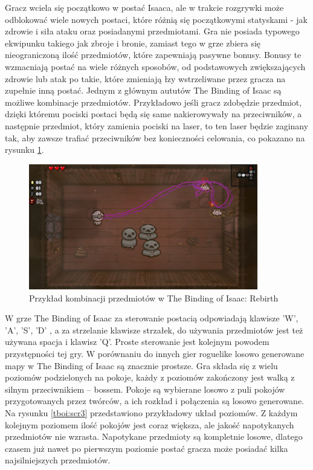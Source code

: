 \documentclass[12pt,twoside]{article}
\begin{document}
Gracz wciela się początkowo w postać Isaaca, ale w trakcie rozgrywki może odblokować wiele nowych postaci, które różnią się początkowymi statyskami - jak zdrowie i siła ataku oraz posiadanymi przedmiotami. Gra nie posiada typowego ekwipunku takiego jak zbroje i bronie, zamiast tego w grze zbiera się nieograniczoną ilość przedmiotów, które zapewniają pasywne bonusy. Bonusy te wzmacniają postać na wiele różnych sposobów, od podstawowych zwiększających zdrowie lub atak po takie, które zmieniają łzy wstrzeliwane przez gracza na zupełnie inną postać. Jednym z głównym aututów The Binding of Isaac są możliwe kombinacje przedmiotów. Przykładowo jeśli gracz zdobędzie przedmiot, dzięki któremu pociski postaci będą się same nakierowywały na przeciwników, a następnie przedmiot, który zamienia pociski na laser, to ten laser będzie zaginany tak, aby zawsze trafiać przeciwników bez konieczności celowania, co pokazano na rysunku \ref{tboi:scr2}.


\FloatBarrier
\begin{figure}[h]
	\centering
	\includegraphics[width=10cm]{images/tboi/scr2.png}
	\caption{Przykład kombinacji przedmiotów w The Binding of Isaac: Rebirth}
	\label{tboi:scr2}
\end{figure}
\FloatBarrier

W grze The Binding of Isaac za sterowanie postacią odpowiadają klawisze 'W', 'A', 'S', 'D' , a za strzelanie klawisze strzałek, do używania przedmiotów jest też używana spacja i klawisz 'Q'. Proste sterowanie jest kolejnym powodem przystępności tej gry.
 W porównaniu do innych gier roguelike losowo generowane mapy w The Binding of Isaac są znacznie prostsze. Gra składa się z wielu poziomów podzielonych na pokoje, każdy z poziomów zakończony jest walką z silnym przeciwnikiem -- bossem. Pokoje są wybierane losowo z puli pokojów przygotowanych przez twórców, a ich rozkład i połączenia są losowo generowane. Na rysunku \ref{tboi:scr3} przedstawiono przykładowy układ poziomów. Z każdym kolejnym poziomem ilość pokojów jest coraz większa, ale jakość napotykanych przedmiotów nie wzrasta. Napotykane przedmioty są kompletnie losowe, dlatego czasem już nawet po pierwszym poziomie postać gracza może posiadać kilka najsilniejszych przedmiotów. 
\end{document}
